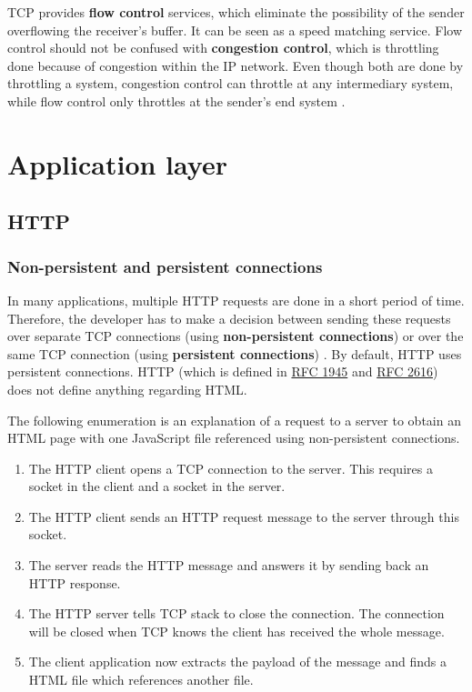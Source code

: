 TCP provides \textbf{flow control} services, which eliminate the possibility of the sender overflowing the receiver's buffer. It can be seen as a speed matching service.
Flow control should not be confused with \textbf{congestion control}, which is throttling done because of congestion within the IP network.
Even though both are done by throttling a system, congestion control can throttle at any intermediary system, while flow control only throttles at the sender's end system \cite[p.~250]{computer-networking-kurose-2012}.

\section{Application layer}

\subsection{HTTP}

\subsubsection{Non-persistent and persistent connections}

In many applications, multiple HTTP requests are done in a short period of time.
Therefore, the developer has to make a decision between sending these requests over separate TCP connections (using \textbf{non-persistent connections}) or over the same TCP connection (using \textbf{persistent connections}) \cite[p.~100]{computer-networking-kurose-2012}. By default, HTTP uses persistent connections.
HTTP (which is defined in \href{https://tools.ietf.org/html/rfc1945}{RFC 1945} and \href{https://tools.ietf.org/html/rfc2616}{RFC 2616}) does not define anything regarding HTML.

The following enumeration is an explanation of a request to a server to obtain an HTML page with one JavaScript file referenced using non-persistent connections.

\begin{enumerate}
\item The HTTP client opens a TCP connection to the server.
This requires a socket in the client and a socket in the server.
\item The HTTP client sends an HTTP request message to the server through this socket.
\item The server reads the HTTP message and answers it by sending back an HTTP response.
\item The HTTP server tells TCP stack to close the connection.
The connection will be closed when TCP knows the client has received the whole message.
\item The client application now extracts the payload of the message and finds a HTML file which references another file.
\end{enumerate}

